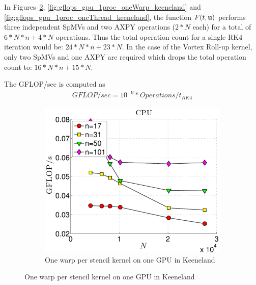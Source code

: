 In Figures~\ref{fig:gflops_cpu_1proc_keeneland}, \ref{fig:gflops_gpu_1proc_oneWarp_keeneland} and \ref{fig:gflops_gpu_1proc_oneThread_keeneland}, the function $F(t,\mathbf{u})$ performs three independent SpMVs and two AXPY operations ($2*N$ each) for a total of $6*N*n + 4*N$ operations. Thus the total operation count for a single RK4 iteration would be: $24*N*n +23*N$. 
In the case of the Vortex Roll-up kernel, only two SpMVs and one AXPY are required which drops the total operation count to: $16*N*n + 15*N$. 

The GFLOP/sec is computed as 
\begin{align}
GFLOP/sec = 10^{-9} * Operations / t_{RK4}
\end{align}

\begin{figure}
\centering
\begin{subfigure}[t]{0.425\textwidth}
\includegraphics[width=1.0\textwidth]{../figures/keeneland_results/alltoallv/gflops_cpu_1proc_oneWarpPerStencil-eps-converted-to.pdf}
\caption{One warp per stencil kernel on one GPU in Keeneland}
\label{fig:gflops_cpu_1proc_keeneland}
\end{subfigure} 


\end{figure}
